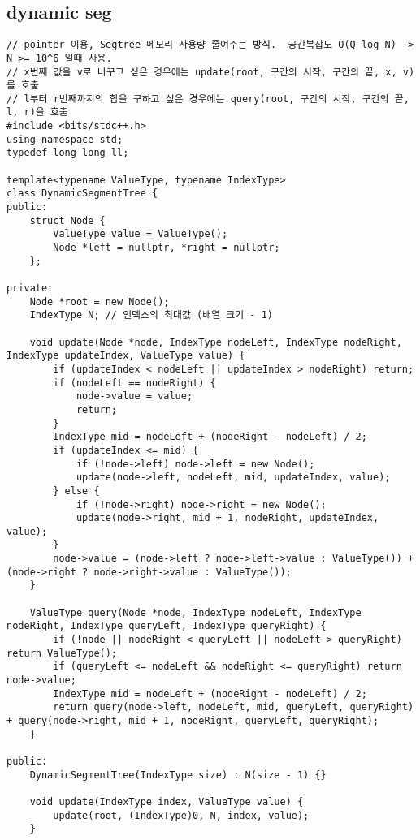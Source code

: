 \documentclass[landscape, 8pt, a4paper, oneside, twocolumn]{extarticle}
\begin{document}
    \subsection{dynamic seg}
    \begin{verbatim}
// pointer 이용, Segtree 메모리 사용량 줄여주는 방식.  공간복잡도 O(Q log N) -> N >= 10^6 일때 사용.
// x번째 값을 v로 바꾸고 싶은 경우에는 update(root, 구간의 시작, 구간의 끝, x, v)를 호출
// l부터 r번째까지의 합을 구하고 싶은 경우에는 query(root, 구간의 시작, 구간의 끝, l, r)을 호출
#include <bits/stdc++.h>
using namespace std;
typedef long long ll;

template<typename ValueType, typename IndexType>
class DynamicSegmentTree {
public:
    struct Node {
        ValueType value = ValueType();
        Node *left = nullptr, *right = nullptr;
    };

private:
    Node *root = new Node();
    IndexType N; // 인덱스의 최대값 (배열 크기 - 1)

    void update(Node *node, IndexType nodeLeft, IndexType nodeRight, IndexType updateIndex, ValueType value) {
        if (updateIndex < nodeLeft || updateIndex > nodeRight) return;
        if (nodeLeft == nodeRight) {
            node->value = value;
            return;
        }
        IndexType mid = nodeLeft + (nodeRight - nodeLeft) / 2;
        if (updateIndex <= mid) {
            if (!node->left) node->left = new Node();
            update(node->left, nodeLeft, mid, updateIndex, value);
        } else {
            if (!node->right) node->right = new Node();
            update(node->right, mid + 1, nodeRight, updateIndex, value);
        }
        node->value = (node->left ? node->left->value : ValueType()) + (node->right ? node->right->value : ValueType());
    }

    ValueType query(Node *node, IndexType nodeLeft, IndexType nodeRight, IndexType queryLeft, IndexType queryRight) {
        if (!node || nodeRight < queryLeft || nodeLeft > queryRight) return ValueType();
        if (queryLeft <= nodeLeft && nodeRight <= queryRight) return node->value;
        IndexType mid = nodeLeft + (nodeRight - nodeLeft) / 2;
        return query(node->left, nodeLeft, mid, queryLeft, queryRight) + query(node->right, mid + 1, nodeRight, queryLeft, queryRight);
    }

public:
    DynamicSegmentTree(IndexType size) : N(size - 1) {}

    void update(IndexType index, ValueType value) {
        update(root, (IndexType)0, N, index, value);
    }


\end{verbatim}
\end{document}
